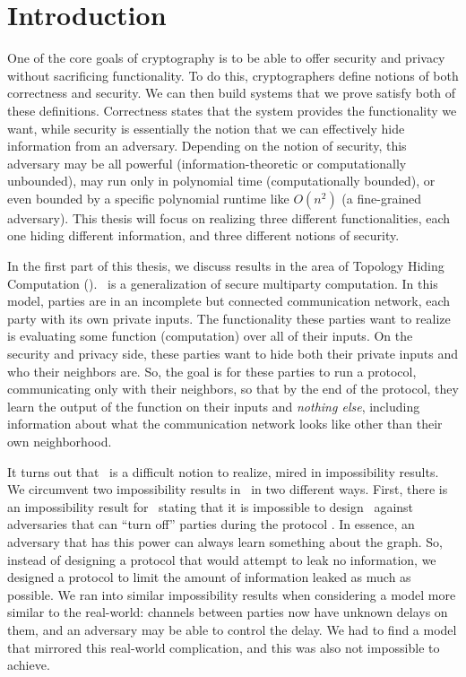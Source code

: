 \chapter{Introduction}

One of the core goals of cryptography is to be able to offer security and privacy without sacrificing functionality.
To do this, cryptographers define notions of both correctness and security. We can then build systems that we prove satisfy both of these definitions. Correctness states that the system provides the functionality we want, while security is essentially the notion that we can effectively hide information from an adversary. Depending on the notion of security, this adversary may be all powerful (information-theoretic or computationally unbounded), may run only in polynomial time (computationally bounded), or even bounded by a specific polynomial runtime like $O(n^2)$ (a fine-grained adversary). This thesis will focus on realizing three different functionalities, each one hiding different information, and three different notions of security.

In the first part of this thesis, we discuss results in the area of Topology Hiding Computation (\THC). \THC~is a generalization of secure multiparty computation. In this model, parties are in an incomplete but connected communication network, each party with its own private inputs. The functionality these parties want to realize is evaluating some function (computation) over all of their inputs. On the security and privacy side, these parties want to hide both their private inputs and who their neighbors are.
So, the goal is for these parties to run a protocol, communicating only with their neighbors, so that by the end of the protocol, they learn the output of the function on their inputs and \emph{nothing else}, including information about what the communication network looks like other than their own neighborhood.

It turns out that \THC~is a difficult notion to realize, mired in impossibility results.
We circumvent two impossibility results in \THC~in two different ways. First, there is an impossibility result for \THC~stating that it is impossible to design \THC~against adversaries that can ``turn off'' parties during the protocol \cite{MOR15}. In essence, an adversary that has this power can always learn something about the graph. So, instead of designing a protocol that would attempt to leak no information, we designed a protocol to limit the amount of information leaked as much as possible. We ran into similar impossibility results when considering a model more similar to the real-world: channels between parties now have unknown delays on them, and an adversary may be able to control the delay. We had to find a model that mirrored this real-world complication, and this was also not impossible to achieve.

